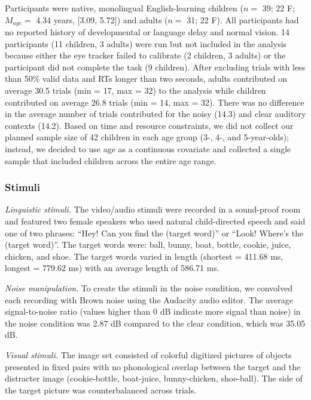 \documentclass[,man,floatsintext]{apa6}
\begin{document}
Participants were native, monolingual English-learning children (\(n=\) 39; 22 F; \(M_{age} =\) 4.34 years, {[}3.09, 5.72{]}) and adults (\(n=\) 31; 22 F). All participants had no reported history of developmental or language delay and normal vision. 14 participants (11 children, 3 adults) were run but not included in the analysis because either the eye tracker failed to calibrate (2 children, 3 adults) or the participant did not complete the task (9 children). After excluding trials with less than 50\% valid data and RTs longer than two seconds, adults contributed on average 30.5 trials (min = 17, max = 32) to the analysis while children contributed on average 26.8 trials (min = 14, max = 32). There was no difference in the average number of trials contributed for the noisy (14.3) and clear auditory contexts (14.2). Based on time and resource constraints, we did not collect our planned sample size of 42 children in each age group (3-, 4-, and 5-year-olds); instead, we decided to use age as a continuous covariate and collected a single sample that included children across the entire age range.

\hypertarget{stimuli-1}{%
\subsubsection{Stimuli}\label{stimuli-1}}

\emph{Linguistic stimuli.} The video/audio stimuli were recorded in a sound-proof room and featured two female speakers who used natural child-directed speech and said one of two phrases: \enquote{Hey! Can you find the (target word)} or \enquote{Look! Where's the (target word)}. The target words were: ball, bunny, boat, bottle, cookie, juice, chicken, and shoe. The target words varied in length (shortest = 411.68 ms, longest = 779.62 ms) with an average length of 586.71 ms.

\emph{Noise manipulation}. To create the stimuli in the noise condition, we convolved each recording with Brown noise using the Audacity audio editor. The average signal-to-noise ratio (values higher than 0 dB indicate more signal than noise) in the noise condition was 2.87 dB compared to the clear condition, which was 35.05 dB.

\emph{Visual stimuli.} The image set consisted of colorful digitized pictures of objects presented in fixed pairs with no phonological overlap between the target and the distracter image (cookie-bottle, boat-juice, bunny-chicken, shoe-ball). The side of the target picture was counterbalanced across trials.
\end{document}
